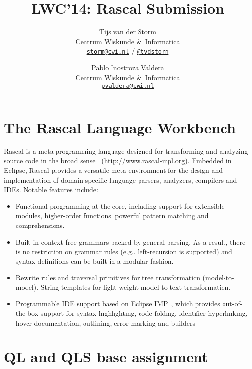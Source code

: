 \documentclass[a4paper]{article}
\begin{document}
\title{LWC'14: Rascal Submission}
\author{Tijs van der Storm \\
Centrum Wiskunde \&\ Informatica \\
\href{mailto:storm@cwi.nl}{\texttt{storm@cwi.nl}} / \href{http://twitter.com/tvdstorm}{\texttt{@tvdstorm}}
\and Pablo Inostroza Valdera\\ 
Centrum Wiskunde \&\ Informatica \\
\href{mailto:pvaldera@cwi.nl}{\texttt{pvaldera@cwi.nl}}
}
\maketitle

\section{The Rascal Language Workbench}

Rascal is a meta programming language designed for transforming and
analyzing source code in the broad sense~\cite{KlintSV09}
(\url{http://www.rascal-mpl.org}). Embedded in Eclipse, Rascal
provides a versatile meta-environment for the design and
implementation of domain-specific language parsers, analyzers,
compilers and IDEs. Notable features include:
\begin{itemize}
\item Functional programming at the core, including support for
  extensible modules, higher-order functions, powerful pattern
  matching and comprehensions.
\item Built-in context-free grammars backed by general parsing. As a
  result, there is no restriction on grammar rules (e.g.,
  left-recursion is supported) and syntax definitions can be built in
  a modular fashion.
\item Rewrite rules and traversal primitives for tree transformation
  (model-to-model). String templates for light-weight model-to-text
  transformation.
\item Programmable IDE support based on Eclipse
  IMP~\cite{CharlesFSDV09}, which provides out-of-the-box support for
  syntax highlighting, code folding, identifier hyperlinking, hover
  documentation, outlining, error marking and builders. 
\end{itemize}


\section{QL and QLS base assignment}
\end{document}
